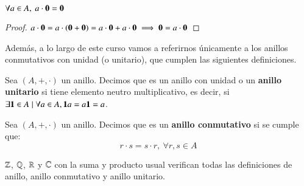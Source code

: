 \begin{pro}
	$\forall a \in A,\ a\cdot \mathbf{0} = \mathbf{0}$
\end{pro}

\begin{proof}
	$a \cdot \mathbf{0} = a \cdot(\mathbf{0} + \mathbf{0}) = a\cdot \mathbf{0} + a\cdot \mathbf{0} \implies \mathbf{0} = a\cdot \mathbf{0}$
\end{proof}

Además, a lo largo de este curso vamos a referirnos únicamente a los anillos conmutativos con unidad (o unitario), que cumplen las siguientes definiciones.

\begin{dfn}
	Sea $(A, +, \cdot)$ un anillo. Decimos que es un anillo con unidad o un \textbf{anillo unitario} si tiene elemento neutro multiplicativo, es decir, si $\exists \mathbf{1} \in A \mid \forall a \in A, \mathbf{1} a = a \mathbf{1} = a$.
\end{dfn}

\begin{dfn}
    Sea $(A, +, \cdot)$ un anillo. Decimos que es un \textbf{anillo conmutativo} si se cumple que:
    $$
        r\cdot s = s\cdot r,\ \forall r,s \in A
    $$
\end{dfn}

\begin{eg}
    $\mathbb{Z}$, $\mathbb{Q}$, $\mathbb{R}$ y $\mathbb{C}$ con la suma y producto usual verifican todas las definiciones de anillo, anillo conmutativo y anillo unitario.
\end{eg}

